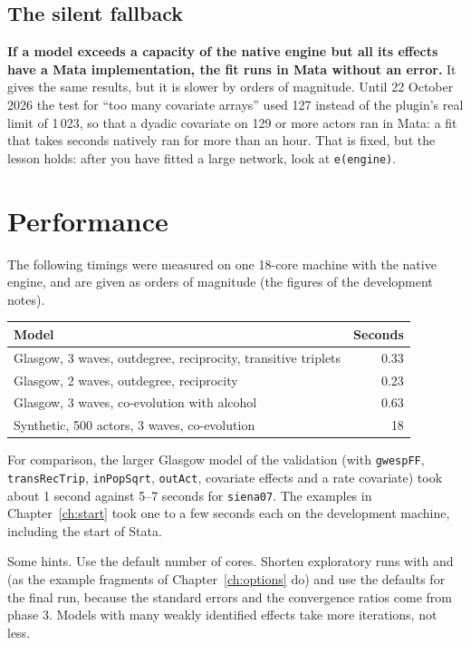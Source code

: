 \subsection{The silent fallback}

\textbf{If a model exceeds a capacity of the native engine but all its effects have a Mata implementation, the fit runs in Mata without an error.} It gives the same results, but it is slower by orders of magnitude. Until 22 October 2026 the test for ``too many covariate arrays'' used 127 instead of the plugin's real limit of 1\,023, so that a dyadic covariate on 129 or more actors ran in Mata: a fit that takes seconds natively ran for more than an hour. That is fixed, but the lesson holds: after you have fitted a large network, look at \texttt{e(engine)}.

\section{Performance}

The following timings were measured on one 18-core machine with the native engine, and are given as orders of magnitude (the figures of the development notes).

\begin{center}
\small
\begin{tabular}{@{}lr@{}}
\toprule
Model & Seconds \\
\midrule
Glasgow, 3 waves, outdegree, reciprocity, transitive triplets & 0.33 \\
Glasgow, 2 waves, outdegree, reciprocity & 0.23 \\
Glasgow, 3 waves, co-evolution with alcohol & 0.63 \\
Synthetic, 500 actors, 3 waves, co-evolution & 18 \\
\bottomrule
\end{tabular}
\end{center}
For comparison, the larger Glasgow model of the validation (with \texttt{gwespFF}, \texttt{transRecTrip}, \texttt{inPopSqrt}, \texttt{outAct}, covariate effects and a rate covariate) took \nwsaom{} about 1 second against 5--7 seconds for \texttt{siena07}. The examples in Chapter~\ref{ch:start} took one to a few seconds each on the development machine, including the start of Stata.

Some hints. Use the default number of cores. Shorten exploratory runs with  and  (as the example fragments of Chapter~\ref{ch:options} do) and use the defaults for the final run, because the standard errors and the convergence ratios come from phase 3. Models with many weakly identified effects take more iterations, not less.

